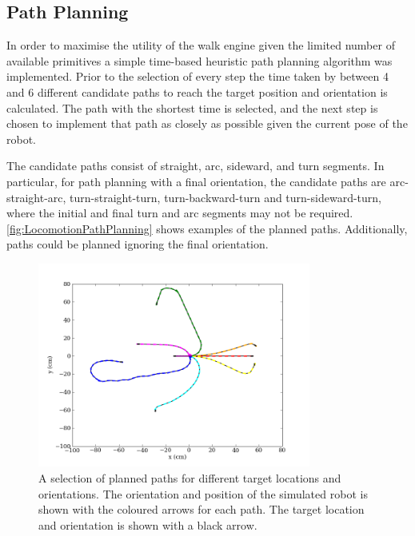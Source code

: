 \subsection{Path Planning}

In order to maximise the utility of the walk engine given the limited number of available primitives a simple time-based heuristic path planning algorithm was implemented. Prior to the selection of every step the time taken by between 4 and 6 different candidate paths to reach the target position and orientation is calculated. The path with the shortest time is selected, and the next step is chosen to implement that path as closely as possible given the current pose of the robot.

The candidate paths consist of straight, arc, sideward, and turn segments.  In particular, for path planning with a final orientation, the candidate paths are arc-straight-arc, turn-straight-turn, turn-backward-turn and turn-sideward-turn, where the initial and final turn and arc segments may not be required. \autoref{fig:LocomotionPathPlanning} shows examples of the planned paths. Additionally, paths could be planned ignoring the final orientation.

\begin{figure}[tbh]
	\begin{center}
		\includegraphics[width=0.8\textwidth]{locomotionfigs/pathplanning.png}
		\caption{A selection of planned paths for different target locations and orientations. The orientation and position of the simulated robot is shown with the coloured arrows for each path. The target location and orientation is shown with a black arrow.}
		\label{fig:LocomotionPathPlanning}
	\end{center}
\end{figure}

